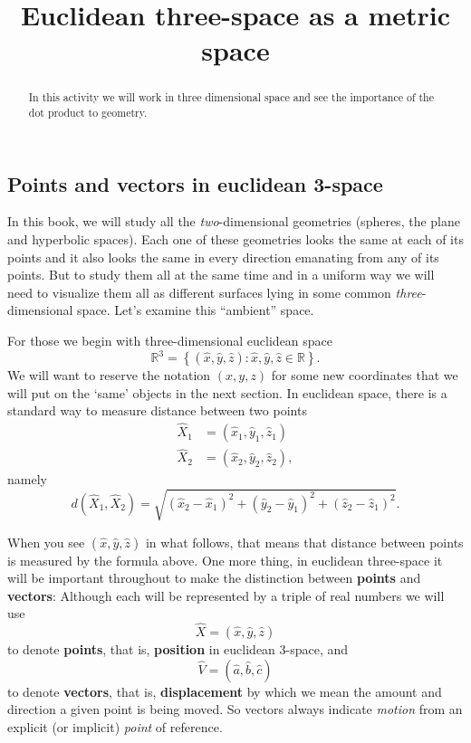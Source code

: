 \documentclass{ximera}
\title{Euclidean three-space as a metric space}
\begin{document}
\begin{abstract}
In this activity we will work in three dimensional space and see the
importance of the dot product to geometry.
\end{abstract}
\maketitle

\subsection*{Points and vectors in euclidean 3-space}

In this book, we will study all the \textit{two}-dimensional
geometries (spheres, the plane and hyperbolic spaces). Each one of
these geometries looks the same at each of its points and it also
looks the same in every direction emanating from any of its
points. But to study them all at the same time and in a uniform way we
will need to visualize them all as different surfaces lying in some
common \textit{three}-dimensional space. Let's examine this
``ambient'' space.


For those we begin with three-dimensional euclidean space%
\[
\mathbb{R}^{3}=\left\{  \left(  \hat{x},\hat{y},\hat{z}\right)  :\hat{x}%
,\hat{y},\hat{z}\in\mathbb{R}\right\}.
\]
We will want to reserve the notation $\left( x,y,z\right) $ for some
new coordinates that we will put on the `same' objects in the next
section. In euclidean space, there is a standard way to measure distance between two points%
\begin{align*}
\hat{X}_{1}  &  =\left(  \hat{x}_{1},\hat{y}_{1},\hat{z}_{1}\right) \\
\hat{X}_{2}  &  =\left(  \hat{x}_{2},\hat{y}_{2},\hat{z}_{2}\right)  ,
\end{align*}
namely%
\begin{equation}
d\left(  \hat{X}_{1},\hat{X}_{2}\right)  =\sqrt{\left(  \hat{x}_{2}-\hat
{x}_{1}\right)  ^{2}+\left(  \hat{y}_{2}-\hat{y}_{1}\right)  ^{2}+\left(
\hat{z}_{2}-\hat{z}_{1}\right)  ^{2}}. \label{0}%
\end{equation}

When you see $\left( \hat{x},\hat{y},\hat{z}\right)$ in what follows,
that means that distance between points is measured by the formula
above. One more thing, in euclidean three-space it
will be important throughout to make the distinction between
\textbf{points} and \textbf{vectors}: Although each will be
represented by a triple of real numbers we will use%
\[
\hat{X}=\left(  \hat{x},\hat{y},\hat{z}\right)
\]
to denote \textbf{points}, that is, \textbf{position} in euclidean $3$-space,
and%
\[
\hat{V}=\left(  \hat{a},\hat{b},\hat{c}\right)
\]
to denote \textbf{vectors}, that is, \textbf{displacement} by which we mean
the amount and direction a given point is being moved. So vectors always
indicate \textit{motion} from an explicit (or implicit) \textit{point} of
reference. 
\end{document}
